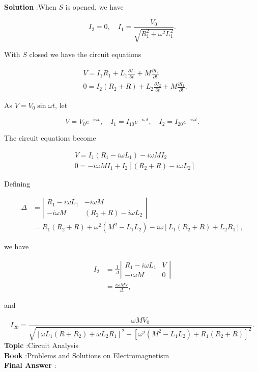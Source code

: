 \documentclass[10pt]{article}
\begin{document}
\textbf{Solution} :When $S$ is opened, we have

$$
I_{2}=0, \quad I_{1}=\frac{V_{0}}{\sqrt{R_{1}^{2}+\omega^{2} L_{1}^{2}}} .
$$

 With $S$ closed we have the circuit equations

$$
\begin{aligned}
&V=I_{1} R_{1}+L_{1} \frac{\partial I_{1}}{\partial t}+M \frac{\partial I_{2}}{\partial t} \\
&0=I_{2}\left(R_{2}+R\right)+L_{2} \frac{\partial I_{2}}{\partial t}+M \frac{\partial I_{1}}{\partial t} .
\end{aligned}
$$

As $V=V_{0} \sin \omega t$, let

$$
V=V_{0} e^{-i \omega t}, \quad I_{1}=I_{10} e^{-i \omega t}, \quad I_{2}=I_{20} e^{-i \omega t} .
$$

The circuit equations become

$$
\begin{aligned}
&V=I_{1}\left(R_{1}-i \omega L_{1}\right)-i \omega M I_{2} \\
&0=-i \omega M I_{1}+I_{2}\left[\left(R_{2}+R\right)-i \omega L_{2}\right]
\end{aligned}
$$

Defining

$$
\begin{aligned}
\Delta &=\left|\begin{array}{cc}
R_{1}-i \omega L_{1} & -i \omega M \\
-i \omega M & \left(R_{2}+R\right)-i \omega L_{2}
\end{array}\right| \\
&=R_{1}\left(R_{2}+R\right)+\omega^{2}\left(M^{2}-L_{1} L_{2}\right)-i \omega\left[L_{1}\left(R_{2}+R\right)+L_{2} R_{1}\right],
\end{aligned}
$$

we have

$$
\begin{aligned}
I_{2} &=\frac{1}{\Delta}\left|\begin{array}{cc}
R_{1}-i \omega L_{1} & V \\
-i \omega M & 0
\end{array}\right| \\
&=\frac{i \omega M V}{\Delta},
\end{aligned}
$$

and

$$
I_{20}=\frac{\omega M V_{0}}{\sqrt{\left[\omega L_{1}\left(R+R_{2}\right)+\omega L_{2} R_{1}\right]^{2}+\left[\omega^{2}\left(M^{2}-L_{1} L_{2}\right)+R_{1}\left(R_{2}+R\right)\right]^{2}}} .
$$
\textbf{Topic} :Circuit Analysis\\
\textbf{Book} :Problems and Solutions on Electromagnetism\\
\textbf{Final Answer} :\\
\end{document}
